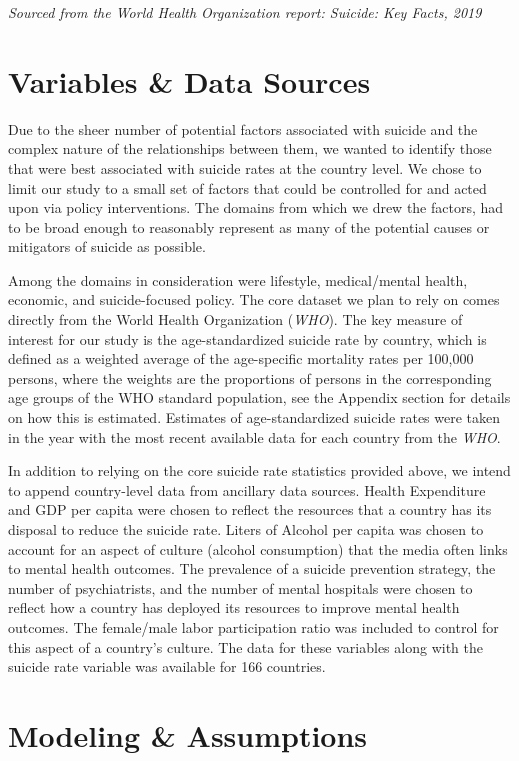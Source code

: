 \documentclass[]{article}
\begin{document}
\emph{Sourced from the World Health Organization report: Suicide: Key
Facts, 2019}

\section{Variables \& Data Sources}\label{variables-data-sources}

Due to the sheer number of potential factors associated with suicide and
the complex nature of the relationships between them, we wanted to
identify those that were best associated with suicide rates at the
country level. We chose to limit our study to a small set of factors
that could be controlled for and acted upon via policy interventions.
The domains from which we drew the factors, had to be broad enough to
reasonably represent as many of the potential causes or mitigators of
suicide as possible.

Among the domains in consideration were lifestyle, medical/mental
health, economic, and suicide-focused policy. The core dataset we plan
to rely on comes directly from the World Health Organization
(\emph{WHO}). The key measure of interest for our study is the
age-standardized suicide rate by country, which is defined as a weighted
average of the age-specific mortality rates per 100,000 persons, where
the weights are the proportions of persons in the corresponding age
groups of the WHO standard population, see the Appendix section for
details on how this is estimated. Estimates of age-standardized suicide
rates were taken in the year with the most recent available data for
each country from the \emph{WHO}.

In addition to relying on the core suicide rate statistics provided
above, we intend to append country-level data from ancillary data
sources. Health Expenditure and GDP per capita were chosen to reflect
the resources that a country has its disposal to reduce the suicide
rate. Liters of Alcohol per capita was chosen to account for an aspect
of culture (alcohol consumption) that the media often links to mental
health outcomes. The prevalence of a suicide prevention strategy, the
number of psychiatrists, and the number of mental hospitals were chosen
to reflect how a country has deployed its resources to improve mental
health outcomes. The female/male labor participation ratio was included
to control for this aspect of a country's culture. The data for these
variables along with the suicide rate variable was available for 166
countries.

\section{Modeling \& Assumptions}\label{modeling-assumptions}
\end{document}
